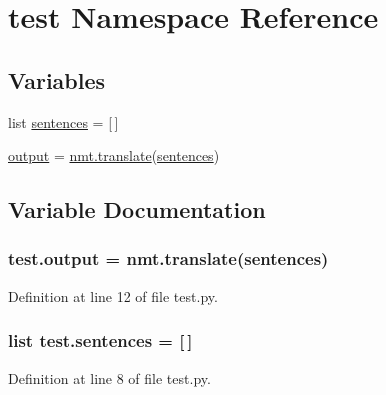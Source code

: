 \hypertarget{namespacetest}{}\section{test Namespace Reference}
\label{namespacetest}
\subsection*{Variables}
\begin{DoxyCompactItemize}
\item 
list \hyperlink{namespacetest_adcc587f95c6a5c19245b161284ca9e0e}{sentences} = \mbox{[}$\,$\mbox{]}
\item 
\hyperlink{namespacetest_a07b64f21658cf1faa97a31563ac979d2}{output} = \hyperlink{amunmt_8cpp_a86ebd9110196f3b5328ad3c3d31cd007}{nmt.\+translate}(\hyperlink{namespacetest_adcc587f95c6a5c19245b161284ca9e0e}{sentences})
\end{DoxyCompactItemize}


\subsection{Variable Documentation}
\subsubsection[{\texorpdfstring{output}{output}}]{\setlength{\rightskip}{0pt plus 5cm}test.\+output = {\bf nmt.\+translate}({\bf sentences})}\hypertarget{namespacetest_a07b64f21658cf1faa97a31563ac979d2}{}\label{namespacetest_a07b64f21658cf1faa97a31563ac979d2}


Definition at line 12 of file test.\+py.

\subsubsection[{\texorpdfstring{sentences}{sentences}}]{\setlength{\rightskip}{0pt plus 5cm}list test.\+sentences = \mbox{[}$\,$\mbox{]}}\hypertarget{namespacetest_adcc587f95c6a5c19245b161284ca9e0e}{}\label{namespacetest_adcc587f95c6a5c19245b161284ca9e0e}


Definition at line 8 of file test.\+py.

